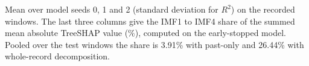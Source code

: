 \begin{table}[!htbp]
\centering
\footnotesize
\caption{Leakage contrast with XGBoost: only the source of the five decomposition channels changes.}\label{tab:s_e1}
\setlength{\tabcolsep}{4pt}
\par\smallskip\begin{minipage}{0.98\linewidth}\footnotesize Mean over model seeds 0, 1 and 2 (standard deviation for $R^2$) on the recorded windows. The last three columns give the IMF1 to IMF4 share of the summed mean absolute TreeSHAP value (\%), computed on the early-stopped model. Pooled over the test windows the share is 3.91\% with past-only and 26.44\% with whole-record decomposition.\end{minipage}
\end{table}
